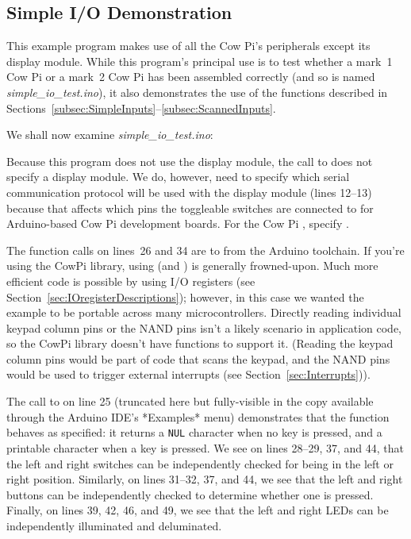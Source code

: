 \subsection{Simple I/O Demonstration}

    This example program makes use of all the Cow Pi's peripherals except its display module.
    While this program's principal use is to test whether a mark~1 Cow Pi or a mark~2 Cow Pi has been assembled correctly (and so is named \textit{simple\_io\_test.ino}), it also demonstrates the use of the functions described in Sections~\ref{subsec:SimpleInputs}--\ref{subsec:ScannedInputs}.

    We shall now examine \textit{simple\_io\_test.ino}:

    

    Because this program does not use the display module, the call to \hyperlink{function:cowpi_setup}{} does not specify a display module.
    We do, however, need to specify which serial communication protocol will be used with the display module (lines 12--13) because that affects which pins the toggleable switches are connected to for Arduino-based Cow Pi development boards.
    For the Cow Pi \cowpiversion, specify .

    The function calls on lines~26 and 34 are to  from the Arduino toolchain.
    If you're using the CowPi library, using  (and ) is generally frowned-upon.
    Much more efficient code is possible by using I/O registers (see Section~\ref{sec:IOregisterDescriptions});
    however, in this case we wanted the example to be portable across many microcontrollers.
    Directly reading individual keypad column pins or the NAND pins isn't a likely scenario in application code, so the CowPi library doesn't have functions to support it.
    (Reading the keypad column pins would be part of code that scans the keypad, and the NAND pins would be used to trigger external interrupts (see Section~\ref{sec:Interrupts})).

    The call to \hyperlink{function:cowpi_get_keypress}{} on line 25 (truncated here but fully-visible in the copy available through the Arduino IDE's *Examples* menu) demonstrates that the function behaves as specified: it returns a \texttt{NUL} character when no key is pressed, and a printable character when a key is pressed.
    We see on lines 28--29, 37, and 44, that the left and right switches can be independently checked for being in the left or right position.
    Similarly, on lines 31--32, 37, and 44, we see that the left and right buttons can be independently checked to determine whether one is pressed.
    Finally, on lines 39, 42, 46, and 49, we see that the left and right LEDs can be independently illuminated and deluminated.

